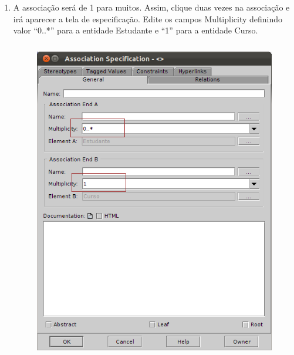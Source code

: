 \begin{enumerate}
	\item A associação será de 1 para muitos. Assim, clique duas vezes na
	associação e irá aparecer a tela de especificação. Edite os campos Multiplicity
	definindo valor “0..*” para a entidade Estudante e “1” para a entidade Curso.
		\begin{figure}[!htb]
			\centering
			\includegraphics[width=350pt,height=400pt]{imgs/tutorial-mdarte-0005.png}
		\end{figure}
	

\end{enumerate}
